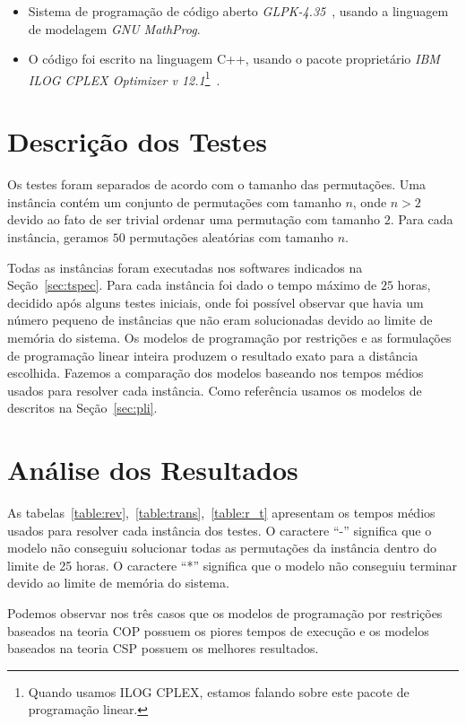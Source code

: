 \begin{itemize}
    \item{Sistema de programação de código
        aberto \textit{GLPK-4.35}~\cite{glpk*2010}, usando a linguagem
        de modelagem \textit{GNU MathProg}.}

    \item{O código foi escrito na linguagem C++, usando o pacote
        proprietário \textit{IBM\textregistered{} ILOG\textregistered{}
        CPLEX\textregistered{} Optimizer v 12.1}\footnote{Quando usamos
        ILOG CPLEX, estamos falando sobre este pacote de programação
        linear.}~\cite{ilogcplex*2011}.}
\end{itemize}

\section{Descrição dos Testes}
\label{sec:testes}
Os testes foram separados de acordo com o tamanho das permutações. Uma
instância contém um conjunto de permutações com tamanho $n$, onde $n >
2$ devido ao fato de ser trivial ordenar uma permutação com tamanho $2$.
Para cada instância, geramos $50$ permutações aleatórias com tamanho
$n$.

Todas as instâncias foram executadas nos softwares indicados na
Seção~\ref{sec:tspec}. Para cada instância foi dado o tempo máximo de
$25$ horas, decidido após alguns testes iniciais, onde foi possível
observar que havia um número pequeno de instâncias que não eram
solucionadas devido ao limite de memória do sistema. Os modelos de
programação por restrições e as formulações de programação linear
inteira produzem o resultado exato para a distância escolhida. Fazemos a
comparação dos modelos baseando nos tempos médios usados para resolver
cada instância. Como referência usamos os modelos de \pli{} descritos na
Seção~\ref{sec:pli}.

\section{Análise dos Resultados}
\label{sec:analise}
As tabelas~\ref{table:rev},~\ref{table:trans},~\ref{table:r_t}
apresentam os tempos médios usados para resolver cada instância dos
testes. O caractere ``-'' significa que o modelo não conseguiu
solucionar todas as permutações da instância dentro do limite de 25
horas. O caractere ``*'' significa que o modelo não conseguiu terminar
devido ao limite de memória do sistema.

Podemos observar nos três casos que os modelos de programação por
restrições baseados na teoria COP possuem os piores tempos de execução e
os modelos baseados na teoria CSP possuem os melhores resultados.

